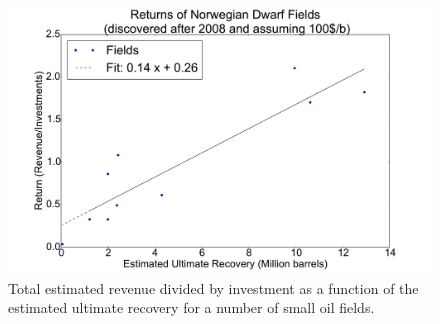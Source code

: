 \documentclass[review]{elsarticle}
\begin{document}
\pagebreak

\begin{figure}[H]
\includegraphics[width=1\columnwidth]{no-returns-size}
\caption{\doublespacing
Total estimated revenue divided by investment as a function of the estimated 
ultimate recovery for a number of small oil fields. }
\label{returnNorwayfield}
\end{figure}
\end{document}
